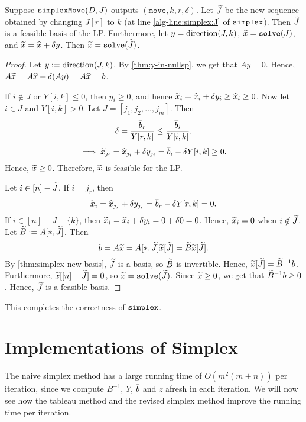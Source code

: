 \begin{lemma}
\label{thm:simplex-feasible-basis}
Suppose $\operatorname{\mathtt{simplexMove}}(D, J)$ outputs $(\mathtt{move}, k, r, \delta)$.
Let $\widetilde{J}$ be the new sequence obtained by changing $J[r]$ to $k$
(at line \ref{alg-line:simplex:J} of $\operatorname{\mathtt{simplex}}$).
Then $\widetilde{J}$ is a feasible basis of the LP.
Furthermore, let $y = \operatorname{direction}(J, k)$, $\widehat{x} = \operatorname{\mathtt{solve}}(J)$, and $\widetilde{x} = \widehat{x} + \delta y$.
Then $\widetilde{x} = \operatorname{\mathtt{solve}}(\widetilde{J})$.
\end{lemma}
\begin{proof}
Let $y := \operatorname{direction}(J, k)$.
By \cref{thm:y-in-nullsp}, we get that $Ay = 0$.
Hence, $A\widetilde{x} = A\widehat{x} + \delta (Ay) = A\widehat{x} = b$.

If $i \not\in J$ or $Y[i, k] \le 0$, then $y_i \ge 0$,
and hence $\widetilde{x}_i = \widehat{x}_i + \delta y_i \ge \widehat{x}_i \ge 0$.
Now let $i \in J$ and $Y[i,k] > 0$.
Let $J = [j_1, j_2, \ldots, j_m]$. Then
\[ \delta = \frac{\overline{b}_r}{Y[r,k]} \le \frac{\overline{b}_i}{Y[i, k]}. \]
\[ \implies \widetilde{x}_{j_i} = \widehat{x}_{j_i} + \delta y_{j_i} = \overline{b}_i - \delta Y[i,k] \ge 0. \]
Hence, $\widetilde{x} \ge 0$. Therefore, $\widetilde{x}$ is feasible for the LP.

Let $i \in [n] - \widetilde{J}$. If $i = j_r$, then
\[ \widetilde{x}_i = \widehat{x}_{j_r} + \delta y_{j_r} = \overline{b}_r - \delta Y[r,k] = 0. \]
If $i \in [n] - J - \{k\}$, then $\widetilde{x}_i = \widehat{x}_i + \delta y_i = 0 + \delta 0 = 0$.
Hence, $\widetilde{x}_i = 0$ when $i \not\in \widetilde{J}$.
Let $\widetilde{B} := A[*,\widetilde{J}]$. Then
\[ b = A\widetilde{x} = A[*,\widetilde{J}]\widetilde{x}[\widetilde{J}] = \widetilde{B}\widetilde{x}[\widetilde{J}]. \]
By \cref{thm:simplex-new-basis}, $\widetilde{J}$ is a basis, so $\widetilde{B}$ is invertible.
Hence, $\widetilde{x}[\widetilde{J}] = \widetilde{B}^{-1}b$.
Furthermore, $\widetilde{x}[[n] - \widetilde{J}] = 0$, so $\widetilde{x} = \operatorname{\mathtt{solve}}(\widetilde{J})$.
Since $\widetilde{x} \ge 0$, we get that $\widetilde{B}^{-1}b \ge 0$.
Hence, $\widetilde{J}$ is a feasible basis.
\end{proof}

This completes the correctness of $\operatorname{\mathtt{simplex}}$.

\section{Implementations of Simplex}

The naive simplex method has a large running time of $O(m^2(m + n))$ per iteration,
since we compute $B^{-1}$, $Y$, $\overline{b}$ and $z$ afresh in each iteration.
We will now see how the tableau method and the revised simplex method
improve the running time per iteration.

